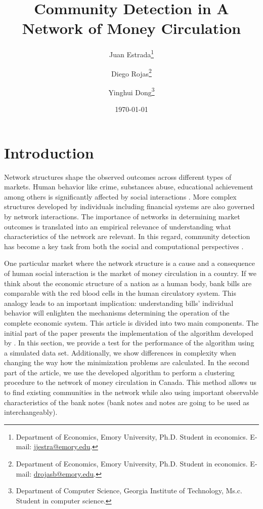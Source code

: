 \documentclass[11pt,letter]{article}%
\numberwithin{equation}{section}
\begin{document}
\title{\textbf{Community Detection in A Network of Money Circulation}}
\author{Juan Estrada\thanks{Department of Economics, Emory University, Ph.D. Student in economics. E-mail: \href{mailto:juan.jose.estrada.sosa@emory.edu}{jjestra@emory.edu}.}\and Diego Rojas\thanks{Department of Economics, Emory University, Ph.D. Student in economics. E-mail: \href{diego.israel.rojas.baez@emory.edu}{drojasb@emory.edu}.}\and Yinghui Dong\thanks{Department of Computer Science, Georgia Institute of Technology, Ms.c. Student in computer science.}}
\date{\today}

\maketitle 


\section{Introduction}

Network structures shape the observed outcomes across different types of markets. Human behavior like crime, substances abuse, educational achievement among others is significantly affected by social interactions \citep{Jackson2008a}. More complex structures developed by individuals including financial systems are also governed by network interactions. The importance of networks in determining market outcomes is translated into an empirical relevance of understanding what characteristics of the network are relevant. In this regard, community detection has become a key task from both the social and computational perspectives \citep{Jackson2019,Du2017}. 

One particular market where the network structure is a cause and a consequence of human social interaction is the market of money circulation in a country. If we think about the economic structure of a nation as a human body, bank bills are comparable with the red blood cells in the human circulatory system. This analogy leads to an important implication: understanding bills' individual behavior will enlighten the mechanisms determining the operation of the complete economic system. This article is divided into two main components. The initial part of the paper presents the implementation of the algorithm developed by \cite{Du2017b}. In this section, we provide a test for the performance of the algorithm using a simulated data set. Additionally, we show differences in complexity when changing the way how the minimization problems are calculated. In the second part of the article, we use the developed algorithm to perform a clustering procedure to the network of money circulation in Canada. This method allows us to find existing communities in the network while also using important observable characteristics of the bank notes (bank notes and notes are going to be used as interchangeably).
\end{document}

